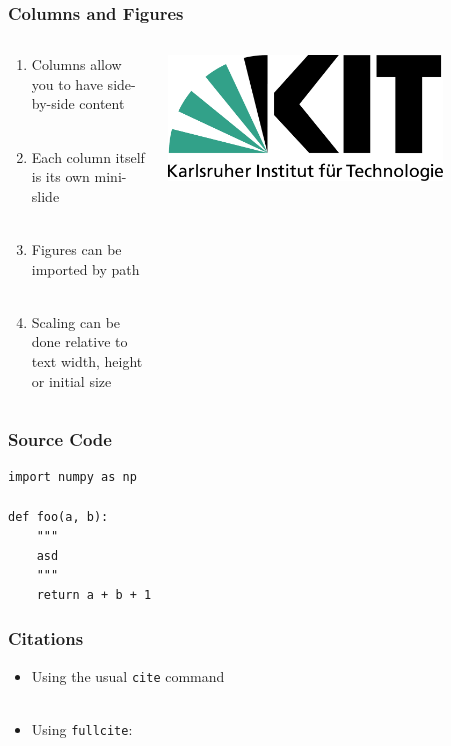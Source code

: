 \documentclass[aspectratio=1610]{beamer}
\begin{document}
\begin{frame}
    \frametitle{Columns and Figures}

    \begin{columns}
        \begin{column}{0.4\textwidth}
            \begin{enumerate}
                \item Columns allow you to have side-by-side content\\~
                \item Each column itself is its own mini-slide\\~
                \item Figures can be imported by path\\~
                \item Scaling can be done relative to text width, height or initial size
            \end{enumerate}
        \end{column}
        \begin{column}{0.4\textwidth}
            \centering
            \includegraphics[width=0.8\textwidth]{logos/kit.pdf}
        \end{column}
    \end{columns}
\end{frame}


\begin{frame}[fragile]
    \frametitle{Source Code}

\begin{verbatim}
import numpy as np

def foo(a, b):
    """
    asd
    """
    return a + b + 1
\end{verbatim}

\end{frame}

\begin{frame}
    \frametitle{Citations}
    
    \begin{itemize}
        \item Using the usual \texttt{cite} command \cite{debus2023reporting}\\~
        
        \item Using \texttt{fullcite}:
    \end{itemize}
    
    \vspace{1em}
\end{frame}
\end{document}
